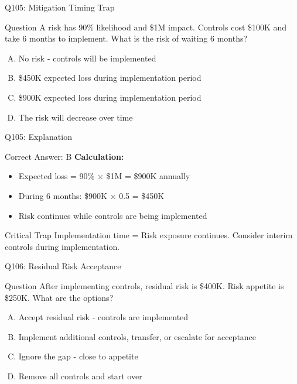 \documentclass{beamer}
\begin{document}
	\begin{frame}{Q105: Mitigation Timing Trap}
		\begin{block}{Question}
			A risk has 90\% likelihood and \$1M impact. Controls cost \$100K and take 6 months to implement. What is the risk of waiting 6 months?
		\end{block}
		\begin{enumerate}[(A)]
			\item No risk - controls will be implemented
			\item \$450K expected loss during implementation period
			\item \$900K expected loss during implementation period
			\item The risk will decrease over time
		\end{enumerate}
	\end{frame}
	
	\begin{frame}{Q105: Explanation}
		\begin{block}{Correct Answer: B}
			\textbf{Calculation:}
			\begin{itemize}
				\item Expected loss = 90\% × \$1M = \$900K annually
				\item During 6 months: \$900K × 0.5 = \$450K
				\item Risk continues while controls are being implemented
			\end{itemize}
		\end{block}
		\begin{alertblock}{Critical Trap}
			Implementation time = Risk exposure continues.
			Consider interim controls during implementation.
		\end{alertblock}
	\end{frame}
	
	\begin{frame}{Q106: Residual Risk Acceptance}
		\begin{block}{Question}
			After implementing controls, residual risk is \$400K. Risk appetite is \$250K. What are the options?
		\end{block}
		\begin{enumerate}[(A)]
			\item Accept residual risk - controls are implemented
			\item Implement additional controls, transfer, or escalate for acceptance
			\item Ignore the gap - close to appetite
			\item Remove all controls and start over
		\end{enumerate}
	\end{frame}
	
\end{document}
